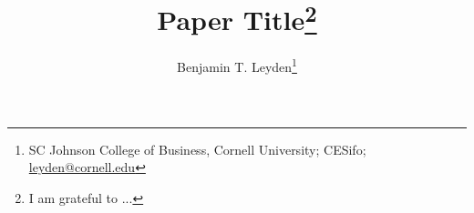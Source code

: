 \documentclass[11pt]{article}
\title{
	Paper Title\thanks{I am grateful to ...}
}
\author{
	Benjamin T. Leyden\footnote{SC Johnson College of Business, Cornell University; CESifo; \href{mailto:leyden@cornell.edu}{leyden@cornell.edu}}
}
\begin{document}
\begin{titlepage}
\maketitle



\end{titlepage}






\newpage

\begin{appendices}
	\setcounter{table}{0}
	\renewcommand{\thetable}{\Alph{section}.\arabic{table}}
	\setcounter{figure}{0}
	\renewcommand{\thefigure}{\Alph{section}.\arabic{figure}}
	
\end{appendices}
\end{document}
